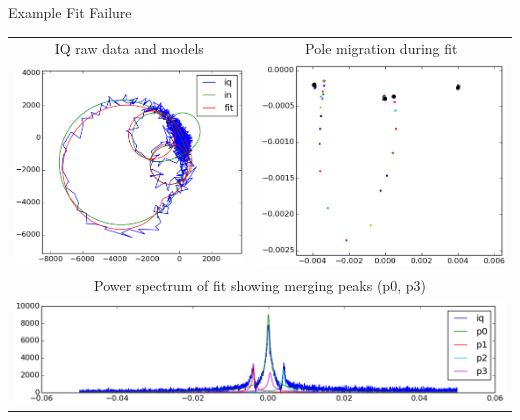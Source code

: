 \documentclass[xcolor=table]{beamer}
\begin{document}
%
\begin{frame}{Example Fit Failure}

\begin{tabular}{cc}
IQ raw data and models & Pole migration during fit \\
\includegraphics[width=0.4\linewidth]{iq-fit.png} &
\includegraphics[width=0.4\linewidth]{pole-motion.png} \\
\multicolumn{2}{c}{Power spectrum of fit showing merging peaks (p0, p3)} \\
\multicolumn{2}{c}{\includegraphics[width=0.9\linewidth]{power-fit.png}} \\
\end{tabular}

\end{frame}
\end{document}

